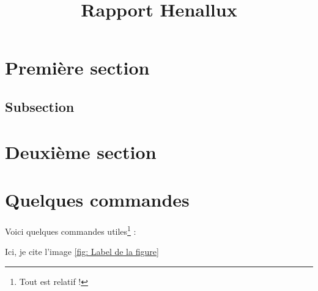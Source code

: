 \documentclass{rapportHenallux}
\title{Rapport Henallux} %
\begin{document}



        
\fairemarges %
\fairepagedegarde %
\tabledematieres %

\setcounter{page}{1}
\section{Première section} 

\lipsum[3-4]%

\subsection{Subsection}

\lipsum[3-4] %

\section{Deuxième section}

\lipsum[3-5] %


\section{Quelques commandes}

Voici quelques commandes utiles\footnote{Tout est relatif !} :


Ici, je cite l'image \ref{fig: Label de la figure}
\end{document}
